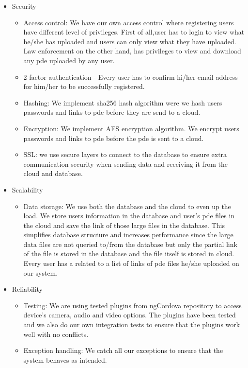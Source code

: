 \documentclass[a4paper,12pt]{article}
\begin{document}
\begin{itemize}
\item Security
	\begin{itemize}
		\item Access control: We have our own access control where registering users have different level of privileges. First of all,user has to login to view what he/she has uploaded and users can only view what they have uploaded. Law enforcement on the other hand, has privileges to view and download any pde uploaded by any user.
		\item 2 factor authentication - Every user has to confirm hi/her email address for him/her to be successfully registered.
		\item Hashing: We implement sha256 hash algorithm were we hash users passwords and links to pde before they are send to a cloud. 
		\item Encryption: We implement AES encryption algorithm. We encrypt users passwords and links to pde before the pde is sent to a cloud. 
		\item SSL: we use secure layers to connect to the database to ensure extra communication security when sending data and receiving it from the cloud and database.
	\end{itemize}
\item Scalability
	\begin{itemize}
		\item Data storage: We use both the database and the cloud to even up the load. We store users information in the database and user's pde files in the cloud and save the link of those large files in the database. This simplifies database structure and increases performance since the large data files are not queried to/from the database but only the partial link of the file is stored in the database and the file itself is stored in cloud. Every user has a related to a list of links of pde files he/she uploaded on our system. 
	\end{itemize}
\item Reliability
	\begin{itemize}
		\item Testing: We are using tested plugins from ngCordova repository to access device's camera, audio and video options. The plugins have been tested and we also do our own integration tests to ensure that the plugins work well with no conflicts.
		\item Exception handling: We catch all our exceptions to ensure that the system behaves as intended.

\end{itemize}
\end{itemize}
\end{document}
